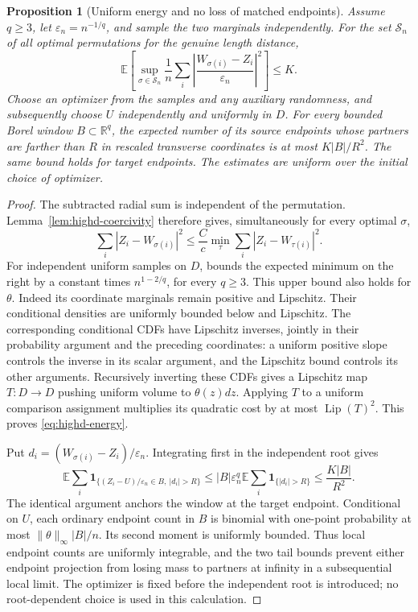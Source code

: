 \documentclass[11pt,reqno]{amsart}
\newtheorem{proposition}[theorem]{Proposition}
\theoremstyle{definition}
\theoremstyle{remark}
\numberwithin{equation}{section}
\newcommand{\R}{\mathbb R}
\newcommand{\E}{\mathbb E}
\newcommand{\Lip}{\operatorname{Lip}}
\begin{document}
\begin{proposition}[Uniform energy and no loss of matched endpoints]
\label{prop:highd-energy}
Assume \(q\ge3\), let \(\varepsilon_n=n^{-1/q}\), and sample the
two marginals independently. For the set \(\mathcal S_n\) of all
optimal permutations for the genuine length distance,
\begin{equation}
\E\!\left[\sup_{\sigma\in\mathcal S_n}
 \frac1n\sum_i
 \left|\frac{W_{\sigma(i)}-Z_i}{\varepsilon_n}\right|^2\right]
 \le K.
\label{eq:highd-energy}
\end{equation}
Choose an optimizer from the samples and any auxiliary randomness,
and subsequently choose \(U\) independently and uniformly in \(D\).
For every bounded Borel window \(B\subset\R^q\), the expected number
of its source endpoints whose partners are farther than \(R\) in
rescaled transverse coordinates is at most \(K|B|/R^2\).
The same bound holds for target endpoints. The estimates are uniform
over the initial choice of optimizer.
\end{proposition}

\begin{proof}
The subtracted radial sum is independent of the permutation.
Lemma~\ref{lem:highd-coercivity} therefore gives, simultaneously
for every optimal \(\sigma\),
\[
\sum_i|Z_i-W_{\sigma(i)}|^2
 \le\frac Cc\min_\tau\sum_i|Z_i-W_{\tau(i)}|^2.
\]
For independent uniform samples on \(D\),
\cite[Theorem~1.1]{GoldmanTrevisan2021} bounds the expected minimum
on the right by a constant times \(n^{1-2/q}\), for every \(q\ge3\).
This upper bound also holds for \(\theta\). Indeed its coordinate
marginals remain positive and Lipschitz. Their conditional densities
are uniformly bounded below and Lipschitz. The corresponding conditional
CDFs have Lipschitz inverses, jointly in their probability argument and
the preceding coordinates: a uniform positive slope controls the
inverse in its scalar argument, and the Lipschitz bound controls its
other arguments. Recursively inverting these CDFs gives a Lipschitz
map \(T:D\to D\) pushing uniform volume to \(\theta(z)dz\).
Applying \(T\) to a uniform comparison assignment multiplies its
quadratic cost by at most \(\Lip(T)^2\). This proves
\eqref{eq:highd-energy}.

Put \(d_i=(W_{\sigma(i)}-Z_i)/\varepsilon_n\).
Integrating first in the independent root gives
\[
\E\sum_i\mathbf1_{\{(Z_i-U)/\varepsilon_n\in B,\ |d_i|>R\}}
 \le |B|\varepsilon_n^q\E\sum_i\mathbf1_{\{|d_i|>R\}}
 \le \frac{K|B|}{R^2}.
\]
The identical argument anchors the window at the target endpoint.
Conditional on \(U\), each ordinary endpoint count in \(B\) is
binomial with one-point probability at most
\(\|\theta\|_\infty|B|/n\). Its second moment is uniformly bounded.
Thus local endpoint counts are uniformly integrable, and the two tail
bounds prevent either endpoint projection from losing mass to partners
at infinity in a subsequential local limit. The optimizer is fixed
before the independent root is introduced; no root-dependent choice
is used in this calculation.
\end{proof}
\end{document}
